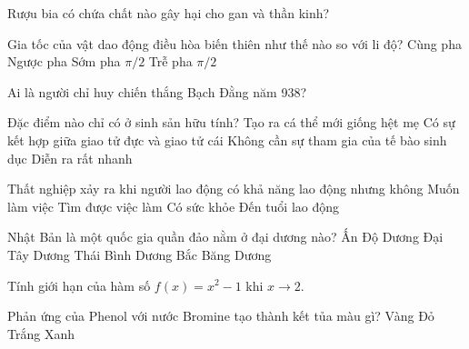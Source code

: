 \begin{ex}
    Rượu bia có chứa chất nào gây hại cho gan và thần kinh?
\end{ex}
\begin{ex}
    Gia tốc của vật dao động điều hòa biến thiên như thế nào so với li độ?
    \choice
    {Cùng pha}
    {\True Ngược pha}
    {Sớm pha $\pi/2$}
    {Trễ pha $\pi/2$}

\end{ex}
\begin{ex}
    Ai là người chỉ huy chiến thắng Bạch Đằng năm 938?
\end{ex}
\begin{ex}
    Đặc điểm nào chỉ có ở sinh sản hữu tính?
    \choice
    {Tạo ra cá thể mới giống hệt mẹ}
    {\True Có sự kết hợp giữa giao tử đực và giao tử cái}
    {Không cần sự tham gia của tế bào sinh dục}
    {Diễn ra rất nhanh}

\end{ex}
\begin{ex}
    Thất nghiệp xảy ra khi người lao động có khả năng lao động nhưng không
    \choice
    {Muốn làm việc}
    {\True Tìm được việc làm}
    {Có sức khỏe}
    {Đến tuổi lao động}

\end{ex}
\begin{ex}
    Nhật Bản là một quốc gia quần đảo nằm ở đại dương nào?
    \choice
    {Ấn Độ Dương}
    {Đại Tây Dương}
    {\True Thái Bình Dương}
    {Bắc Băng Dương}

\end{ex}
\begin{ex}
    Tính giới hạn của hàm số $f(x) = x^2 - 1$ khi $x \to 2$.
\end{ex}
\begin{ex}
    Phản ứng của Phenol với nước Bromine tạo thành kết tủa màu gì?
    \choice
    {Vàng}
    {Đỏ}
    {\True Trắng}
    {Xanh}

\end{ex}
